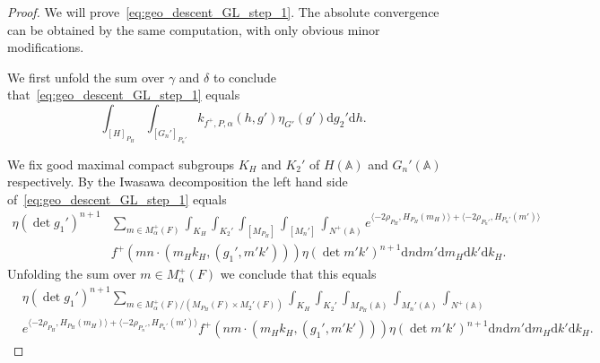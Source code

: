 \documentclass[10pt,a4paper]{amsart}
\newcommand{\bA}{\mathbb{A}}
\newcommand{\rd}{\mathrm{d}}
\begin{document}
\begin{proof}
We will prove~\eqref{eq:geo_descent_GL_step_1}. The absolute convergence can
be obtained by the same computation, with only obvious minor modifications.

We first unfold the sum over $\gamma$ and $\delta$ to conclude
that~\eqref{eq:geo_descent_GL_step_1} equals
    \[
    \int_{[H]_{P_H}} \int_{[G_n']_{P_{n}'}}
    k_{f^+, P, \alpha}(h,  g') \eta_{G'}(g') \rd g_2' \rd h.
    \]

We fix good maximal compact subgroups $K_H$ and $K_2'$ of $H(\bA)$ and $G_n'(\bA)$ respectively. By the Iwasawa decomposition the left hand side
of~\eqref{eq:geo_descent_GL_step_1} equals
    \begin{align*}
    \eta(\det g_1')^{n+1} &
    \sum_{m \in M_{\alpha}^+(F)}
    \int_{K_H}
    \int_{K_2'} \int_{[M_{P_H}]} \int_{[M_n']} \int_{N^+(\bA)}
     e^{\langle
    -2\rho_{P_H},H_{P_H}(m_H)\rangle+\langle -2\rho_{P_n'}, H_{P_n'}(m')
    \rangle }
    \\ &f^+ (mn \cdot (m_H k_H, (g_1',m'k')))
     \eta(\det m'k')^{n+1} \rd n \rd m'  \rd m_H  \rd k' \rd k_H.
    \end{align*}
Unfolding the sum over $m \in M_{\alpha}^+(F)$ we conclude that this equals
    \begin{align*}
    &\eta(\det g_1')^{n+1}
    \sum_{m \in M^+_{\alpha}(F)/(M_{P_H}(F)  \times
    M_2'(F))}
    \int_{K_H} \int_{K_2'} \int_{M_{P_H}(\bA)}
    \int_{M_n'(\bA)} \int_{N^+(\bA)}
      \\
    &e^{\langle
    -2\rho_{P_H},H_{P_H}(m_H)\rangle
    +\langle -2\rho_{P_n'},H_{P_n'}(m') \rangle }
    f^+ \left(nm \cdot (m_H k_H, (g_1',m'k'))\right)
    \eta(\det m'k')^{n+1} \rd n \rd m'  \rd m_H \rd k' \rd k_H.
    \end{align*}


\end{proof}
\end{document}
